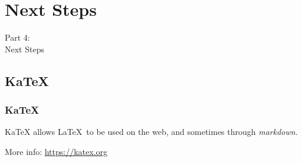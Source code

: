 {
\renewcommand{\bgcolor}{next}

\section{Next Steps}
\begin{frame}
  \vspace{25mm}
  \begin{center}
    \Huge{Part 4:\\Next Steps}
  \end{center}
\end{frame}

\subsection{KaTeX}
\begin{frame}[fragile]
  \frametitle{KaTeX}
  \vspace{3mm}
  KaTeX allows \LaTeX\ to be used on the web, and sometimes through \textsl{markdown}.
  
  \vspace{5mm}
  More info: \url{https://katex.org}
  
\end{frame}

}


